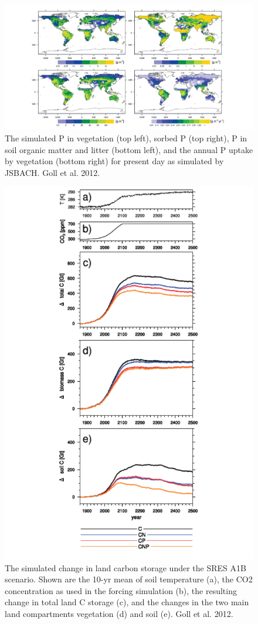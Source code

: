 \documentclass[
  12pt,
  oneside]{book}
\begin{document}
\begin{figure}

{\centering \includegraphics[width=0.8\linewidth]{figures/chap5/f522_goll_Pmaps} 

}

\caption{The simulated P in vegetation (top left), sorbed P (top right), P in soil organic matter and litter (bottom left), and the annual P uptake by vegetation (bottom right) for present day as simulated by JSBACH. Goll et al. 2012.}\label{fig:f522}
\end{figure}

\begin{figure}

{\centering \includegraphics[width=0.8\linewidth]{figures/chap5/f523_goll_sink} 

}

\caption{The simulated change in land carbon storage under the SRES A1B scenario. Shown are the 10-yr mean of soil temperature (a), the CO2 concentration as used in the forcing simulation (b), the resulting change in total land C storage (c), and the changes in the two main land compartments vegetation (d) and soil (e). Goll et al. 2012.}\label{fig:f523}
\end{figure}
\end{document}
